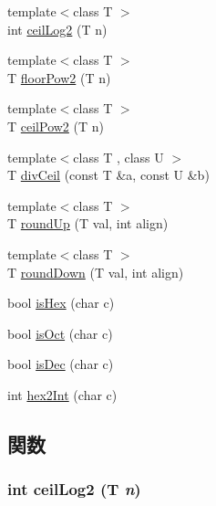 \begin{DoxyCompactItemize}
\item 
{\footnotesize template$<$class T $>$ }\\int \hyperlink{intmath_8hh_a0ec4eaea50888f737b803dc9427614bf}{ceilLog2} (T n)
\item 
{\footnotesize template$<$class T $>$ }\\T \hyperlink{intmath_8hh_a9486f78f0d06687602e134537d9bfe3a}{floorPow2} (T n)
\item 
{\footnotesize template$<$class T $>$ }\\T \hyperlink{intmath_8hh_a334dc85c238ca64b4e9658e05cec6cba}{ceilPow2} (T n)
\item 
{\footnotesize template$<$class T , class U $>$ }\\T \hyperlink{intmath_8hh_ae842b412d3570df97a944085b8f85850}{divCeil} (const T \&a, const U \&b)
\item 
{\footnotesize template$<$class T $>$ }\\T \hyperlink{intmath_8hh_a4d254a89b294890f6ce3a474f4e8c6c7}{roundUp} (T val, int align)
\item 
{\footnotesize template$<$class T $>$ }\\T \hyperlink{intmath_8hh_a343c19b0ae885d5f3c7960987096e9d5}{roundDown} (T val, int align)
\item 
bool \hyperlink{intmath_8hh_ab7ca9ee391118aafe6f3cf7df4fa5de3}{isHex} (char c)
\item 
bool \hyperlink{intmath_8hh_a6c0f35ebd0c531065480e2de41c0adff}{isOct} (char c)
\item 
bool \hyperlink{intmath_8hh_a8b463f338b8712a8914d9f8f6cf45db8}{isDec} (char c)
\item 
int \hyperlink{intmath_8hh_a3219427263826ba5f1080f2abe2c3cb9}{hex2Int} (char c)
\end{DoxyCompactItemize}


\subsection{関数}
\hypertarget{intmath_8hh_a0ec4eaea50888f737b803dc9427614bf}{
\subsubsection[{ceilLog2}]{\setlength{\rightskip}{0pt plus 5cm}int ceilLog2 (T {\em n})}}
\label{intmath_8hh_a0ec4eaea50888f737b803dc9427614bf}



